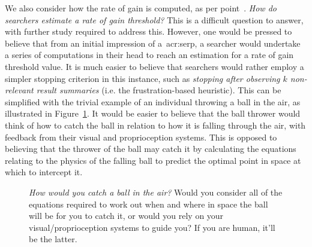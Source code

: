 We also consider how the rate of gain is computed, as per point~. \emph{How do searchers estimate a rate of gain threshold?} This is a difficult question to answer, with further study required to address this. However, one would be pressed to believe that from an initial impression of a~\gls{acr:serp}, a searcher would undertake a series of computations in their head to reach an estimation for a rate of gain threshold value. It is much easier to believe that searchers would rather employ a simpler stopping criterion in this instance, such as \emph{stopping after observing $k$ non-relevant result summaries} (i.e. the frustration-based heuristic). This can be simplified with the trivial example of an individual throwing a ball in the air, as illustrated in Figure~\ref{fig:ball}. It would be easier to believe that the ball thrower would think of how to catch the ball in relation to how it is falling through the air, with feedback from their visual and proprioception systems. This is opposed to believing that the thrower of the ball may catch it by calculating the equations relating to the physics of the falling ball to predict the optimal point in space at which to intercept it.

\begin{figure}[t!]
    \centering
    \caption[Catching a ball \textemdash~with physics or feedback?]{\emph{How would you catch a ball in the air?} Would you consider all of the equations required to work out when and where in space the ball will be for you to catch it, or would you rely on your visual/proprioception systems to guide you? If you are human, it'll be the latter.}
    \label{fig:ball}
\end{figure}

